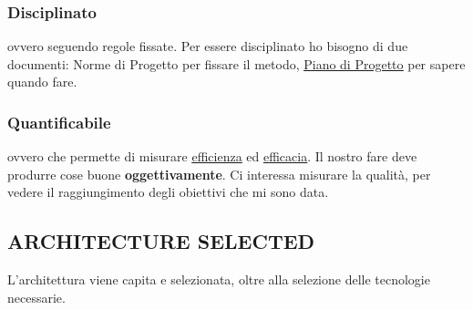 			\subsubsection{Disciplinato} \label{disciplinato}
			ovvero seguendo regole fissate.
			Per essere disciplinato ho bisogno di due documenti: Norme di Progetto per fissare il metodo, \underline{\hyperref[piano]{Piano di Progetto}} per sapere quando fare.
			\subsubsection{Quantificabile} \label{quantificabile}
			ovvero che permette di misurare \underline{\hyperref[efficienza]{efficienza}} ed \underline{\hyperref[efficacia]{efficacia}}. Il nostro fare deve produrre cose buone \textbf{oggettivamente}. Ci interessa misurare la qualità, per vedere il raggiungimento degli obiettivi che mi sono data.

		\subsection{ARCHITECTURE SELECTED}		\label{architectureselected}
		L'architettura viene capita e selezionata, oltre alla selezione delle tecnologie necessarie.

